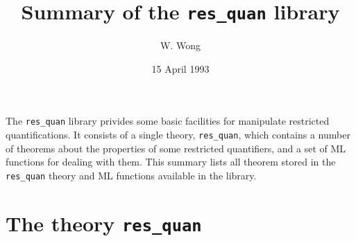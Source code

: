 
\title{Summary of the {\tt res\_quan} library}
\author{W. Wong}
\date{15 April 1993}




\maketitle

The {\tt res\_quan} library privides some basic facilities for
manipulate restricted quantifications. It consists of a single theory,
{\tt res\_quan}, which  contains a number of theorems about the
properties of some restricted quantifiers, and a set of ML functions
for dealing with them. This summary lists all theorem stored in the
{\tt res\_quan} theory and ML functions available in the library.

\section{The theory {\tt res\_quan}}

